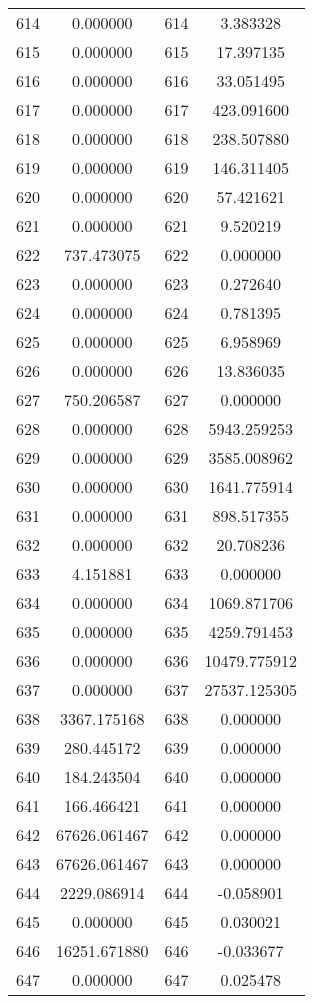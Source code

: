\documentclass[12pt]{article}
\begin{document}
\begin{longtable}{@{}cccc@{}}
614 & 0.000000 & 614 & 3.383328 \\
615 & 0.000000 & 615 & 17.397135 \\
616 & 0.000000 & 616 & 33.051495 \\
617 & 0.000000 & 617 & 423.091600 \\
618 & 0.000000 & 618 & 238.507880 \\
619 & 0.000000 & 619 & 146.311405 \\
620 & 0.000000 & 620 & 57.421621 \\
621 & 0.000000 & 621 & 9.520219 \\
622 & 737.473075 & 622 & 0.000000 \\
623 & 0.000000 & 623 & 0.272640 \\
624 & 0.000000 & 624 & 0.781395 \\
625 & 0.000000 & 625 & 6.958969 \\
626 & 0.000000 & 626 & 13.836035 \\
627 & 750.206587 & 627 & 0.000000 \\
628 & 0.000000 & 628 & 5943.259253 \\
629 & 0.000000 & 629 & 3585.008962 \\
630 & 0.000000 & 630 & 1641.775914 \\
631 & 0.000000 & 631 & 898.517355 \\
632 & 0.000000 & 632 & 20.708236 \\
633 & 4.151881 & 633 & 0.000000 \\
634 & 0.000000 & 634 & 1069.871706 \\
635 & 0.000000 & 635 & 4259.791453 \\
636 & 0.000000 & 636 & 10479.775912 \\
637 & 0.000000 & 637 & 27537.125305 \\
638 & 3367.175168 & 638 & 0.000000 \\
639 & 280.445172 & 639 & 0.000000 \\
640 & 184.243504 & 640 & 0.000000 \\
641 & 166.466421 & 641 & 0.000000 \\
642 & 67626.061467 & 642 & 0.000000 \\
643 & 67626.061467 & 643 & 0.000000 \\
644 & 2229.086914 & 644 & -0.058901 \\
645 & 0.000000 & 645 & 0.030021 \\
646 & 16251.671880 & 646 & -0.033677 \\
647 & 0.000000 & 647 & 0.025478 \\

\end{longtable}
\end{document}
